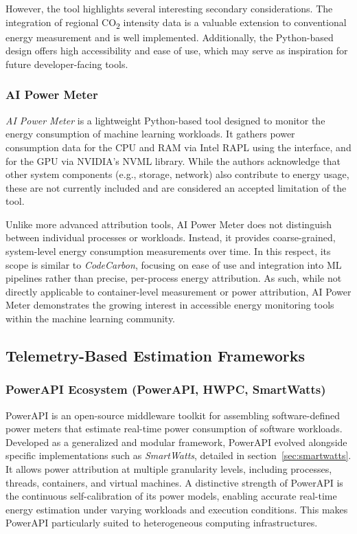 However, the tool highlights several interesting secondary considerations. The integration of regional CO\textsubscript{2} intensity data is a valuable extension to conventional energy measurement and is well implemented. Additionally, the Python-based design offers high accessibility and ease of use, which may serve as inspiration for future developer-facing tools.

\subsubsection{AI Power Meter}
\textit{AI Power Meter}\parencite{aipowermeter} is a lightweight Python-based tool designed to monitor the energy consumption of machine learning workloads. It gathers power consumption data for the CPU and RAM via Intel RAPL using the  interface, and for the GPU via NVIDIA’s NVML library. While the authors acknowledge that other system components (e.g., storage, network) also contribute to energy usage, these are not currently included and are considered an accepted limitation of the tool.

Unlike more advanced attribution tools, AI Power Meter does not distinguish between individual processes or workloads. Instead, it provides coarse-grained, system-level energy consumption measurements over time. In this respect, its scope is similar to \textit{CodeCarbon}, focusing on ease of use and integration into ML pipelines rather than precise, per-process energy attribution. As such, while not directly applicable to container-level measurement or power attribution, AI Power Meter demonstrates the growing interest in accessible energy monitoring tools within the machine learning community.

\subsection{Telemetry-Based Estimation Frameworks}
\label{sec:telemetry-tools}

\subsubsection{PowerAPI Ecosystem\parencite{powerapi2024github} (PowerAPI, HWPC, SmartWatts)}
\label{sec:powerApiFramework}

PowerAPI\parencite{fieni2024powerapi} is an open-source middleware toolkit for assembling software-defined power meters that estimate real-time power consumption of software workloads. Developed as a generalized and modular framework, PowerAPI evolved alongside specific implementations such as \textit{SmartWatts}, detailed in section~\ref{sec:smartwatts}. It allows power attribution at multiple granularity levels, including processes, threads, containers, and virtual machines. A distinctive strength of PowerAPI is the continuous self-calibration of its power models, enabling accurate real-time energy estimation under varying workloads and execution conditions. This makes PowerAPI particularly suited to heterogeneous computing infrastructures.

